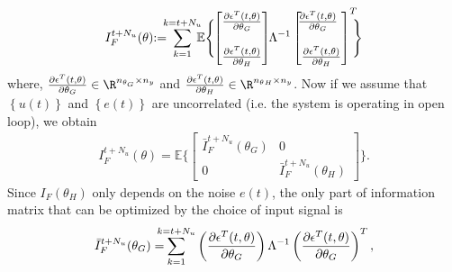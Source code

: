 \documentclass{ifacconf}
\begin{document}
\begin{equation}
{I}_F^{t+N_u}(\theta)  \hspace{-0.1cm} := \hspace{-0.2cm}  \sum_{k=1}^{k = t+N_u}  \hspace{-0.2cm}  \mathbb{E} \Bigg \{\hspace{-0.1cm}
																				\begin{bmatrix}
																					\frac{\partial \epsilon^T(t,\theta)}{\partial \theta_G}\\
																					\\
																					\frac{\partial \epsilon^T(t,\theta)}{\partial \theta_H}\\
																				\end{bmatrix} \hspace{-0.1cm}
																						\Lambda^{-1}
																			\begin{bmatrix}\hspace{-0.2cm}
																					\frac{\partial \epsilon^T(t,\theta)}{\partial \theta_G}\\
																					\\
																					\frac{\partial \epsilon^T(t,\theta)}{\partial \theta_H}\\
																				\end{bmatrix}^T  \hspace{-0.2cm} \Bigg \}
\end{equation}
where, $\frac{\partial \epsilon^T(t,\theta)}{\partial \theta_G} \in \R^{n_{\theta_G} \times n_y}$ and $\frac{\partial \epsilon^T(t,\theta)}{\partial \theta_H} \in \R^{{n_\theta}_H \times n_y}$. Now if we assume that $\left\{u(t)\right\}$ and $\left\{e(t)\right\}$ are uncorrelated (i.e. the system is operating in open loop), we obtain
\vspace{-0.2cm}
\begin{eqnarray}
{I}_F^{t+N_u}(\theta) = \mathbb{E}  \{
						\begin{bmatrix}
							\bar{I}_F^{t+N_u}(\theta_G) & 0\\
								0 &  \bar{I}_F^{t+N_u}(\theta_H)
\end{bmatrix} \}.
\end{eqnarray}
Since $I_F(\theta_H)$ only depends on the noise $e(t)$, the only part of information matrix that can be optimized by the choice of input signal is
\vspace{-0.05cm}
\begin{equation}
\bar{I}_F^{t+N_u}(\theta_G) =  \hspace{-0.3cm} \sum_{k=1}^{k = t+N_u}
																			\left( \frac{\partial \epsilon^T(t,\theta)}{\partial \theta_G} \right)
																			\Lambda^{-1}
																			\left( \frac{\partial \epsilon^T(t,\theta)}{\partial \theta_G} \right)^T,
\end{equation}
\end{document}
